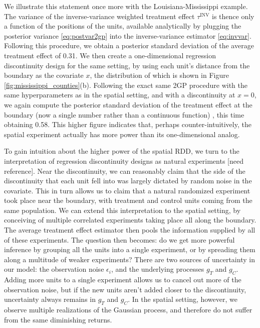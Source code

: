 \documentclass[letter]{article}
\newcommand{\invvar}{\tau^{\mathrm{INV}}}
\begin{document}
We illustrate this statement once more with the Louisiana-Mississippi example.
The variance of the inverse-variance weighted treatment effect \(\invvar\) is thence only a function of the positions of the units, available analytically by plugging the posterior variance \eqref{eq:postvar2gp} into the inverse-variance estimator \eqref{eq:invvar}.
Following this procedure, we obtain a posterior standard deviation of the average treatment effect of 0.31.
We then create a one-dimensional regression discontinuity design for the same setting, by using each unit's distance from the boundary as the covariate \(x\), the distribution of which is shown in Figure \ref{fig:mississippi_counties}(b).
Following the exact same 2GP procedure with the same hyperparameters as in the spatial setting, and with a discontinuity at \(x=0\), we again compute the posterior standard deviation of the treatment effect at the boundary (now a single number rather than a continuous function) , this time obtaining 0.58.
This higher figure indicates that, perhaps counter-intuitively, the spatial experiment actually has more power than its one-dimensional analog.

To gain intuition about the higher power of the spatial RDD, we turn to the interpretation of regression discontinuity designs as natural experiments {[}need reference{]}.
Near the discontinuity, we can reasonably claim that the side of the discontinuity that each unit fell into was largely dictated by random noise in the covariate.
This in turn allows us to claim that a natural randomized experiment took place near the boundary, with treatment and control units coming from the same population.
We can extend this interpretation to the spatial setting, by conceiving of multiple correlated experiments taking place all along the boundary.
The average treatment effect estimator then pools the information supplied by all of these experiments.
The question then becomes: do we get more powerful inference by grouping all the units into a single experiment, or by spreading them along a multitude of weaker experiments?
There are two sources of uncertainty in our model: the observation noise \(\epsilon_i\), and the underlying processes \(g_T\) and \(g_C\). Adding more units to a single experiment allows us to cancel out more of the observation noise, but if the new units aren't added closer to the discontinuity, uncertainty always remains in \(g_T\) and \(g_C\). In the spatial setting, however, we observe multiple realizations of the Gaussian process, and therefore do not suffer from the same diminishing returns.
    
\end{document}
